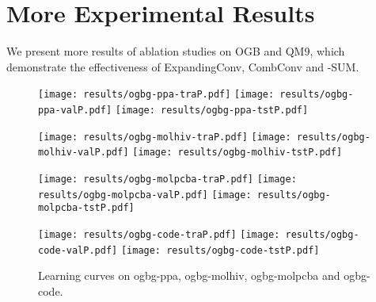 \documentclass{article} \usepackage{iclr2021_conference,times}
\begin{document}
\begin{table}[h]
\centering
\caption{Number of layers for QM9.}\smallskip
{}
\label{qm9-hyper-individual}
\end{table}


\section{More Experimental Results}
\label{results-details}

We present more results of ablation studies on OGB and QM9,
which demonstrate the effectiveness of ExpandingConv, CombConv and -SUM.

\begin{figure}[h]
\centering
\texttt{[image: results/ogbg-ppa-traP.pdf]}
\texttt{[image: results/ogbg-ppa-valP.pdf]}
\texttt{[image: results/ogbg-ppa-tstP.pdf]}

\texttt{[image: results/ogbg-molhiv-traP.pdf]}
\texttt{[image: results/ogbg-molhiv-valP.pdf]}
\texttt{[image: results/ogbg-molhiv-tstP.pdf]}

\texttt{[image: results/ogbg-molpcba-traP.pdf]}
\texttt{[image: results/ogbg-molpcba-valP.pdf]}
\texttt{[image: results/ogbg-molpcba-tstP.pdf]}

\texttt{[image: results/ogbg-code-traP.pdf]}
\texttt{[image: results/ogbg-code-valP.pdf]}
\texttt{[image: results/ogbg-code-tstP.pdf]}
\caption{Learning curves on ogbg-ppa, ogbg-molhiv, ogbg-molpcba and ogbg-code.}
\label{curve-ogbg-code}
\end{figure}
\end{document}

